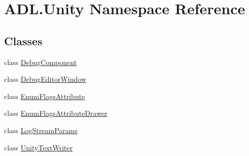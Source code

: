 \hypertarget{namespace_a_d_l_1_1_unity}{}\section{A\+D\+L.\+Unity Namespace Reference}
\label{namespace_a_d_l_1_1_unity}
\subsection*{Classes}
\begin{DoxyCompactItemize}
\item 
class \mbox{\hyperlink{class_a_d_l_1_1_unity_1_1_debug_component}{Debug\+Component}}
\item 
class \mbox{\hyperlink{class_a_d_l_1_1_unity_1_1_debug_editor_window}{Debug\+Editor\+Window}}
\item 
class \mbox{\hyperlink{class_a_d_l_1_1_unity_1_1_enum_flags_attribute}{Enum\+Flags\+Attribute}}
\item 
class \mbox{\hyperlink{class_a_d_l_1_1_unity_1_1_enum_flags_attribute_drawer}{Enum\+Flags\+Attribute\+Drawer}}
\item 
class \mbox{\hyperlink{class_a_d_l_1_1_unity_1_1_log_stream_params}{Log\+Stream\+Params}}
\item 
class \mbox{\hyperlink{class_a_d_l_1_1_unity_1_1_unity_text_writer}{Unity\+Text\+Writer}}
\end{DoxyCompactItemize}
